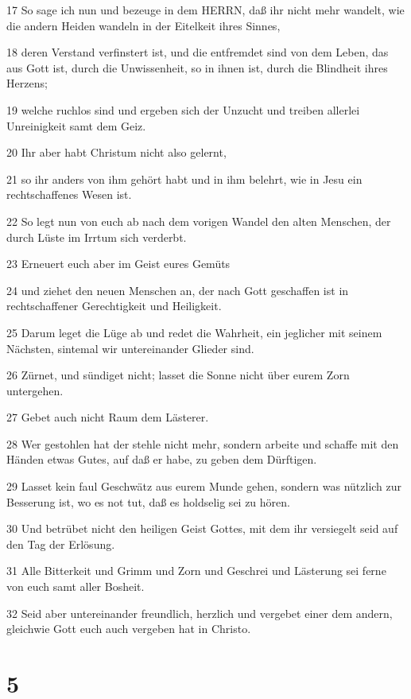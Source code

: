 \par 17 So sage ich nun und bezeuge in dem HERRN, daß ihr nicht mehr wandelt, wie die andern Heiden wandeln in der Eitelkeit ihres Sinnes,
\par 18 deren Verstand verfinstert ist, und die entfremdet sind von dem Leben, das aus Gott ist, durch die Unwissenheit, so in ihnen ist, durch die Blindheit ihres Herzens;
\par 19 welche ruchlos sind und ergeben sich der Unzucht und treiben allerlei Unreinigkeit samt dem Geiz.
\par 20 Ihr aber habt Christum nicht also gelernt,
\par 21 so ihr anders von ihm gehört habt und in ihm belehrt, wie in Jesu ein rechtschaffenes Wesen ist.
\par 22 So legt nun von euch ab nach dem vorigen Wandel den alten Menschen, der durch Lüste im Irrtum sich verderbt.
\par 23 Erneuert euch aber im Geist eures Gemüts
\par 24 und ziehet den neuen Menschen an, der nach Gott geschaffen ist in rechtschaffener Gerechtigkeit und Heiligkeit.
\par 25 Darum leget die Lüge ab und redet die Wahrheit, ein jeglicher mit seinem Nächsten, sintemal wir untereinander Glieder sind.
\par 26 Zürnet, und sündiget nicht; lasset die Sonne nicht über eurem Zorn untergehen.
\par 27 Gebet auch nicht Raum dem Lästerer.
\par 28 Wer gestohlen hat der stehle nicht mehr, sondern arbeite und schaffe mit den Händen etwas Gutes, auf daß er habe, zu geben dem Dürftigen.
\par 29 Lasset kein faul Geschwätz aus eurem Munde gehen, sondern was nützlich zur Besserung ist, wo es not tut, daß es holdselig sei zu hören.
\par 30 Und betrübet nicht den heiligen Geist Gottes, mit dem ihr versiegelt seid auf den Tag der Erlösung.
\par 31 Alle Bitterkeit und Grimm und Zorn und Geschrei und Lästerung sei ferne von euch samt aller Bosheit.
\par 32 Seid aber untereinander freundlich, herzlich und vergebet einer dem andern, gleichwie Gott euch auch vergeben hat in Christo.

\chapter{5}

